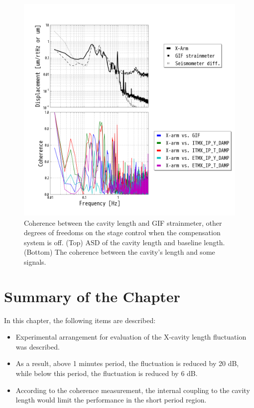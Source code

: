 \begin{figure}[p]
    \centering 
    \includegraphics[width=15cm]{./img_chap6/img615.png}
    \caption{Coherence between the cavity length and GIF strainmeter, other degrees of freedoms on the stage control when the compensation system is off. (Top) ASD of the cavity length and baseline length. (Bottom) The coherence between the cavity's length and some signals.}\label{img:img615}
\end{figure}



\section{Summary of the Chapter} \label{sec:sec53}
In this chapter, the following items are described:
\begin{itemize}
\item Experimental arrangement for evaluation of the X-cavity length fluctuation was described.
\item As a result, above 1 minutes period, the fluctuation is reduced by 20 dB, while below this period, the fluctuation is reduced by 6 dB.
\item According to the coherence measurement, the internal coupling to the cavity length would limit the performance in the short period region.
\end{itemize}


